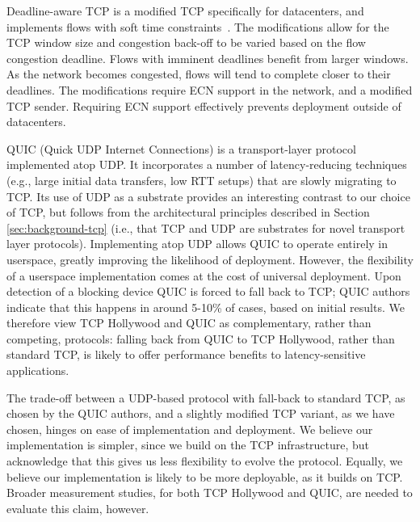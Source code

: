 Deadline-aware TCP is a modified TCP  specifically for datacenters, and
implements flows with soft time constraints~\cite{vamanan:2012:d2tcp}. The
modifications allow for the TCP window size and congestion back-off to be varied
based on the flow congestion deadline. Flows with imminent deadlines benefit
from larger windows. As the network becomes congested, flows will tend to
complete closer to their deadlines. The modifications require ECN support in the
network, and a modified TCP sender. Requiring ECN support effectively prevents
deployment outside of datacenters.

QUIC (Quick UDP Internet Connections) \cite{IS15} is a transport-layer protocol
implemented atop UDP. It incorporates a number of latency-reducing techniques
(e.g., large initial data transfers, low RTT setups) that are slowly migrating
to TCP. Its use of UDP as a substrate provides an interesting contrast to our
choice of TCP, but follows from the architectural principles described in Section
\ref{sec:background-tcp} (i.e., that TCP and UDP are substrates for novel transport
layer protocols). Implementing atop UDP allows QUIC to operate entirely in userspace,
greatly improving the likelihood of deployment. However, the flexibility
of a userspace implementation comes at the cost of universal deployment. Upon detection 
of a blocking device QUIC is forced to
fall back to TCP; QUIC authors indicate that this happens in around 5-10\% of cases, based
on initial results. We therefore view TCP Hollywood and QUIC as complementary, rather
than competing, protocols: falling back from QUIC to TCP Hollywood, rather than standard
TCP, is likely to offer performance benefits to latency-sensitive applications.

The trade-off between a UDP-based protocol with fall-back to standard TCP,
as chosen by the QUIC authors, and a slightly modified TCP variant, as we
have chosen, hinges on ease of implementation and deployment. We believe
our implementation is simpler, since we build on the TCP infrastructure,
but acknowledge that this gives us less flexibility to evolve the protocol.
Equally, we believe our implementation is likely to be more deployable, as
it builds on TCP. Broader measurement studies, for both TCP Hollywood and
QUIC, are needed to evaluate this claim, however.

